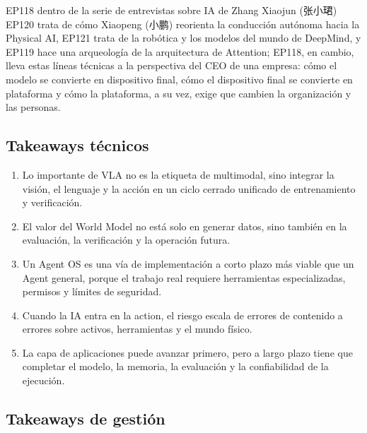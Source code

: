 \documentclass[a4paper]{article}
\begin{document}
\begin{importantbox}{EP118 dentro de la serie de entrevistas sobre IA de Zhang Xiaojun (张小珺)}
EP120 trata de cómo Xiaopeng (小鹏) reorienta la conducción autónoma hacia la Physical AI, EP121 trata de la robótica y los modelos del mundo de DeepMind, y EP119 hace una arqueología de la arquitectura de Attention; EP118, en cambio, lleva estas líneas técnicas a la perspectiva del CEO de una empresa: cómo el modelo se convierte en dispositivo final, cómo el dispositivo final se convierte en plataforma y cómo la plataforma, a su vez, exige que cambien la organización y las personas.
\end{importantbox}

\subsection{Takeaways técnicos}

\begin{enumerate}
\item Lo importante de VLA no es la etiqueta de multimodal, sino integrar la visión, el lenguaje y la acción en un ciclo cerrado unificado de entrenamiento y verificación.
\item El valor del World Model no está solo en generar datos, sino también en la evaluación, la verificación y la operación futura.
\item Un Agent OS es una vía de implementación a corto plazo más viable que un Agent general, porque el trabajo real requiere herramientas especializadas, permisos y límites de seguridad.
\item Cuando la IA entra en la action, el riesgo escala de errores de contenido a errores sobre activos, herramientas y el mundo físico.
\item La capa de aplicaciones puede avanzar primero, pero a largo plazo tiene que completar el modelo, la memoria, la evaluación y la confiabilidad de la ejecución.
\end{enumerate}

\subsection{Takeaways de gestión}
\end{document}
